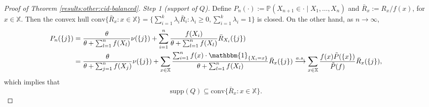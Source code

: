\documentclass[a4paper]{article}
\theoremstyle{plain}
\theoremstyle{remark}
\theoremstyle{definition}
\begin{document}
\begin{proof}[Proof of Theorem \ref{results:other:cid-balanced}]
\noindent\textit{Step 1 (support of $Q$).} Define $P_n(\cdot):=\mathbb{P}(X_{n+1}\in\cdot\mid X_1,\ldots,X_n)$ and $\bar{R}_x:=R_x/f(x)$, for $x\in\mathbb{X}$. Then the convex hull $\mbox{conv}\{\bar{R}_x:x\in\mathbb{X}\}=\{\sum_{i=1}^k\lambda_i\bar{R}_{i}:\lambda_i\geq0,\sum_{i=1}^k\lambda_i=1\}$ is closed. On the other hand, as $n\rightarrow\infty$,
\begingroup\allowdisplaybreaks
\begin{align*}
P_n(\{j\})&=\frac{\theta}{\theta+\sum_{l=1}^nf(X_l)}\nu(\{j\})+\sum_{i=1}^n\frac{f(X_i)}{\theta+\sum_{l=1}^nf(X_l)}\bar{R}_{X_i}(\{j\})\\
&=\frac{\theta}{\theta+\sum_{j=1}^nf(X_j)}\nu(\{j\})+\sum_{x\in\mathbb{X}}\frac{\sum_{i=1}^nf(x)\cdot\mathbbm{1}_{\{X_i=x\}}}{\theta+\sum_{l=1}^nf(X_l)}\bar{R}_x(\{j\})\overset{a.s.}{\longrightarrow}\sum_{x\in\mathbb{X}}\frac{f(x)\tilde{P}(\{x\})}{\tilde{P}(f)}\bar{R}_x(\{j\}),
\end{align*}
\endgroup
which implies that
\[\mbox{supp}(Q)\subseteq\mbox{conv}\{\bar{R}_x:x\in\mathbb{X}\}.\]


\end{proof}
\end{document}
